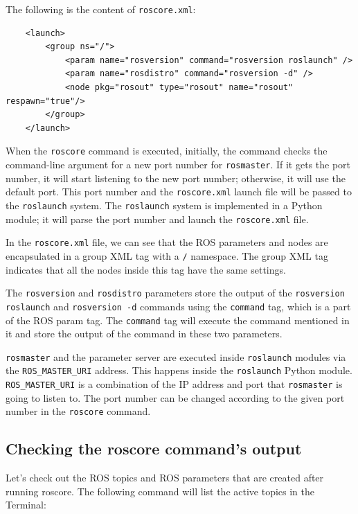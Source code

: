\documentclass[../../main]{subfiles}
\begin{document}
The following is the content of \texttt{roscore.xml}:

\begin{verbatim}
    <launch>
        <group ns="/">
            <param name="rosversion" command="rosversion roslaunch" />
            <param name="rosdistro" command="rosversion -d" />
            <node pkg="rosout" type="rosout" name="rosout" respawn="true"/>
        </group>
    </launch>
\end{verbatim}

When the \texttt{roscore} command is executed, initially, the command checks the command-line argument for a new port number for \texttt{rosmaster}. If it gets the port number, it will start listening to the new port number; otherwise, it will use the default port. This port number and the \texttt{roscore.xml} launch file will be passed to the \texttt{roslaunch} system. The \texttt{roslaunch} system is implemented in a Python module; it will parse the port number and launch the \texttt{roscore.xml} file.

In the \texttt{roscore.xml} file, we can see that the ROS parameters and nodes are encapsulated in a group XML tag with a \texttt{/} namespace. The group XML tag indicates that all the nodes inside this tag have the same settings.


The \texttt{rosversion} and \texttt{rosdistro} parameters store the output of the \texttt{rosversion roslaunch} and \texttt{rosversion -d} commands using the \texttt{command} tag, which is a part of the ROS param tag. The \texttt{command} tag will execute the command mentioned in it and store the output of the command in these two parameters.

\texttt{rosmaster} and the parameter server are executed inside \texttt{roslaunch} modules via the \texttt{ROS\_MASTER\_URI} address. This happens inside the \texttt{roslaunch} Python module.\\ \texttt{ROS\_MASTER\_URI} is a combination of the IP address and port that \texttt{rosmaster} is going to listen to. The port number can be changed according to the given port number in the \texttt{roscore} command.

\subsection{Checking the roscore command's output}
Let's check out the ROS topics and ROS parameters that are created after running roscore. The following command will list the active topics in the Terminal:
\end{document}
